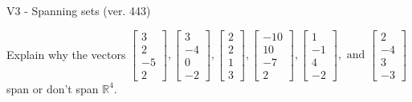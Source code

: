 \begin{exercise}
  \begin{exerciseTitle}V3 - Spanning sets (ver. 443)\end{exerciseTitle}
  \begin{exerciseStatement}
    Explain why the vectors \(\left[\begin{array}{r}
3 \\
2 \\
-5 \\
2
\end{array}\right] , \left[\begin{array}{r}
3 \\
-4 \\
0 \\
-2
\end{array}\right] , \left[\begin{array}{r}
2 \\
2 \\
1 \\
3
\end{array}\right] , \left[\begin{array}{r}
-10 \\
10 \\
-7 \\
2
\end{array}\right] , \left[\begin{array}{r}
1 \\
-1 \\
4 \\
-2
\end{array}\right] , \text{ and } \left[\begin{array}{r}
2 \\
-4 \\
3 \\
-3
\end{array}\right]\) span or don't span \(\mathbb{R}^4\). 
	



\end{exerciseStatement}
\end{exercise}
